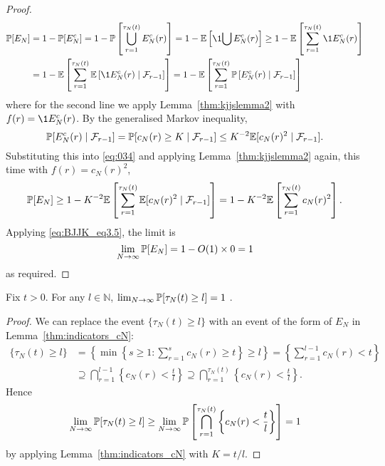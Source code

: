 \begin{proof}
\begin{align}
\Prob[E_N]
&= 1- \Prob[E_N^c]
= 1- \Prob\left[ \bigcup_{r=1}^{\tau_N(t)} E_N^c(r) \right]
= 1- \E\left[ \1{\bigcup E_N^c(r)} \right]
\geq 1 - \E\left[ \sum_{r=1}^{\tau_N(t)} \1{E_N^c(r)} \right] \notag\\
&= 1- \E\left[  \sum_{r=1}^{\tau_N(t)} \E\left[ \1{E_N^c(r)} 
        \mid \mathcal{F}_{r-1} \right] \right]
= 1- \E\left[  \sum_{r=1}^{\tau_N(t)} \Prob\left[ E_N^c(r)
        \mid \mathcal{F}_{r-1} \right] \right] \label{eq:034}
\end{align}
where for the second line we apply Lemma~\ref{thm:kjjslemma2} with $f(r) = \1{E_N^c(r)} $.
By the generalised Markov inequality,
\begin{equation*}
\mathbb{P}[ E_N^c(r) \mid \mathcal{F}_{r-1} ]
= \mathbb{P}[ c_N(r) \geq K \mid \mathcal{F}_{r-1} ]
\leq K^{-2} \mathbb{E}[c_N(r)^2 \mid \mathcal{F}_{r-1} ] .
\end{equation*}
Substituting this into \eqref{eq:034} and applying Lemma~\ref{thm:kjjslemma2} again, this time with $f(r) = c_N(r)^2$,
\begin{equation*}
\mathbb{P}[E_N]
\geq 1- K^{-2} \mathbb{E}\left[  \sum_{r=1}^{\tau_N(t)} 
        \mathbb{E}[c_N(r)^2 \mid \mathcal{F}_{r-1} ] \right]
= 1 - K^{-2} \mathbb{E}\left[  \sum_{r=1}^{\tau_N(t)} c_N(r)^2 \right] .
\end{equation*}
Applying \eqref{eq:BJJK_eq3.5}, the limit is
\begin{equation*}
\lim_{N\to\infty} \mathbb{P}[E_N]
= 1 - O(1) \times 0
=1 
\end{equation*}
as required.
\end{proof}


\begin{lemma}\label{thm:indicators_tau}
Fix $t>0$. For any $l \in \mathbb{N}$,
$\lim_{N\to\infty} \mathbb{P}[ \tau_N(t) \geq l ] =1$ .
\end{lemma}

\begin{proof}
We can replace the event $\{ \tau_N(t) \geq l \}$ with an event of the form of $E_N$ in Lemma~\ref{thm:indicators_cN}:
\begin{align*}
\{ \tau_N(t) \geq l \} 
&= \left\{ \min \left\{ s \geq 1 : \sum_{r=1}^{s} c_N(r) \geq t \right\} \geq l \right\}
= \left\{ \sum_{r=1}^{l-1} c_N(r) < t \right\} \\
&\supseteq \bigcap_{r=1}^{l-1} \left \{ c_N(r) < \frac{t}{l} \right\}
\supseteq \bigcap_{r=1}^{\tau_N(t)} \left \{ c_N(r) < \frac{t}{l} \right\} .
\end{align*}
Hence
\begin{equation*}
\lim_{N\to\infty} \mathbb{P}[ \tau_N(t) \geq l ] 
\geq \lim_{N\to\infty} \mathbb{P}\left[ \bigcap_{r=1}^{\tau_N(t)} 
        \left \{ c_N(r) < \frac{t}{l} \right\} \right]
=1
\end{equation*}
by applying Lemma~\ref{thm:indicators_cN} with $K=t/l$.
\end{proof}



